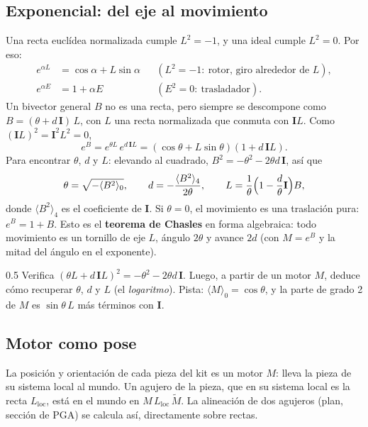 \documentclass[11pt,a4paper]{article}
\numberwithin{equation}{section}
\newcommand{\rev}[1]{\widetilde{#1}}
\newcommand{\I}{\mathbf{I}}
\begin{document}
\subsection{Exponencial: del eje al movimiento}
Una recta euclídea normalizada cumple $L^2 = -1$, y una ideal cumple $L^2 = 0$. Por eso:
\begin{align}
  e^{\alpha L} &= \cos\alpha + L\sin\alpha && (L^2 = -1:\ \text{rotor, giro alrededor de } L),\\
  e^{\alpha E} &= 1 + \alpha E && (E^2 = 0:\ \text{trasladador}).
\end{align}
Un bivector general $B$ no es una recta, pero siempre se descompone como $B = (\theta + d\,\I)\,L$, con $L$ una recta
normalizada que conmuta con $\I L$. Como $(\I L)^2 = \I^2L^2 = 0$,
\begin{equation}
  e^{B} = e^{\theta L}\,e^{d\,\I L} = (\cos\theta + L\sin\theta)(1 + d\,\I L).
\end{equation}
Para encontrar $\theta$, $d$ y $L$: elevando al cuadrado, $B^2 = -\theta^2 - 2\theta d\,\I$, así que
\begin{equation}
  \theta = \sqrt{-\langle B^2\rangle_0},\qquad d = -\frac{\langle B^2\rangle_4}{2\theta},\qquad
  L = \frac{1}{\theta}\Bigl(1 - \frac{d}{\theta}\I\Bigr)B,
\end{equation}
donde $\langle B^2\rangle_4$ es el coeficiente de $\I$. Si $\theta = 0$, el movimiento es una traslación pura:
$e^B = 1 + B$. Esto es el \textbf{teorema de Chasles} en forma algebraica: todo movimiento es un tornillo de eje $L$,
ángulo $2\theta$ y avance $2d$ (con $M = e^{B}$ y la mitad del ángulo en el exponente).

\begin{ejercicio}{0.5}
Verifica $(\theta L + d\,\I L)^2 = -\theta^2 - 2\theta d\,\I$. Luego, a partir de un motor $M$, deduce cómo recuperar
$\theta$, $d$ y $L$ (el \emph{logaritmo}). Pista: $\langle M\rangle_0 = \cos\theta$, y la parte de grado 2 de $M$ es
$\sin\theta\,L$ más términos con $\I$.
\end{ejercicio}

\subsection{Motor como pose}
La posición y orientación de cada pieza del kit es un motor $M$: lleva la pieza de su sistema local al mundo. Un
agujero de la pieza, que en su sistema local es la recta $L_{\text{loc}}$, está en el mundo en
$M\,L_{\text{loc}}\,\rev M$. La alineación de dos agujeros (plan, sección de PGA) se calcula así, directamente sobre rectas.
\end{document}

